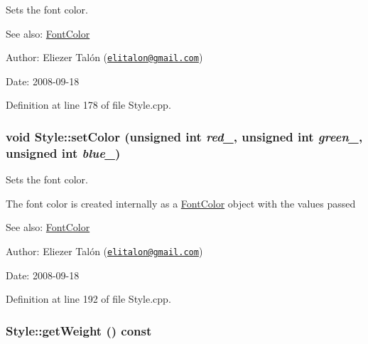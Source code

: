 Sets the font color. 

\begin{Desc}
\item[See also:]\hyperlink{struct_font_color}{FontColor}\end{Desc}
\begin{Desc}
\item[Author:]Eliezer Talón (\href{mailto:elitalon@gmail.com}{\tt elitalon@gmail.com}) \end{Desc}
\begin{Desc}
\item[Date:]2008-09-18 \end{Desc}


Definition at line 178 of file Style.cpp.\hypertarget{class_style_4f2df0b03c03b39036732a51716305a0}{
\subsubsection[setColor]{\setlength{\rightskip}{0pt plus 5cm}void Style::setColor (unsigned int {\em red\_\-}, \/  unsigned int {\em green\_\-}, \/  unsigned int {\em blue\_\-})}}
\label{class_style_4f2df0b03c03b39036732a51716305a0}


Sets the font color. 

The font color is created internally as a \hyperlink{struct_font_color}{FontColor} object with the values passed

\begin{Desc}
\item[See also:]\hyperlink{struct_font_color}{FontColor}\end{Desc}
\begin{Desc}
\item[Author:]Eliezer Talón (\href{mailto:elitalon@gmail.com}{\tt elitalon@gmail.com}) \end{Desc}
\begin{Desc}
\item[Date:]2008-09-18 \end{Desc}


Definition at line 192 of file Style.cpp.\hypertarget{class_style_5798e7a57bb2df5e37aa0cdc5606a8b3}{
\subsubsection[getWeight]{ Style::getWeight () const}}
\label{class_style_5798e7a57bb2df5e37aa0cdc5606a8b3}


